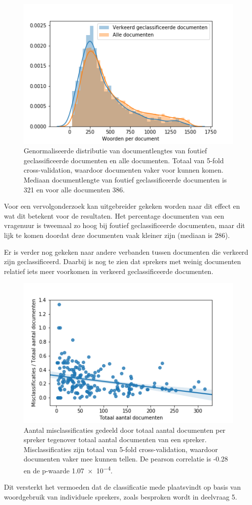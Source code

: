 \begin{figure}[H]
  \centering
    \includegraphics[width=0.40\paperwidth]{Verslag/Tables/misclassifiedlengths.png}
\caption{Genormaliseerde distributie van documentlengtes van foutief geclassificeerde documenten en alle documenten. Totaal van 5-fold cross-validation, waardoor documenten vaker voor kunnen komen. Mediaan documentlengte van foutief geclassificeerde documenten is 321 en voor alle documenten 386.}
\label{fig:misclassified}
\end{figure}
Voor een vervolgonderzoek kan uitgebreider gekeken worden naar dit effect en wat dit betekent voor de resultaten. Het percentage documenten van een vragenuur is tweemaal zo hoog bij foutief geclassificeerde documenten, maar dit lijk te komen doordat deze documenten vaak kleiner zijn (mediaan is 286).\par
Er is verder nog gekeken naar andere verbanden tussen documenten die verkeerd zijn geclassificeerd. Daarbij is nog te zien dat sprekers met weinig documenten relatief iets meer voorkomen in verkeerd geclassificeerde documenten.
\begin{figure}[H]
  \centering
    \includegraphics[width=0.60\paperwidth]{Verslag/Tables/misclassifiedsprekers.png}
\caption{Aantal misclassificaties gedeeld door totaal aantal documenten per spreker tegenover totaal aantal documenten van een spreker. Misclassificaties zijn totaal van 5-fold cross-validation, waardoor documenten vaker mee kunnen tellen. De pearson correlatie is -0.28 en de p-waarde \num{1.07e-4}.}
\label{fig:misclassifiedsprekers}
\end{figure}
Dit versterkt het vermoeden dat de classificatie mede plaatsvindt op basis van woordgebruik van individuele sprekers, zoals besproken wordt in deelvraag 5.\par


